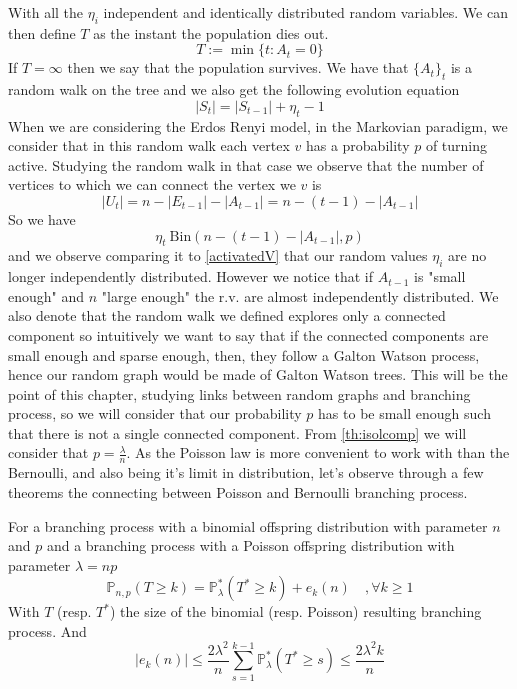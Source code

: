 With all the $\eta_i$ independent and identically distributed random variables.
We can then define $T$ as the instant the population dies out.
\begin{equation}
	T := \min\{t: A_t = 0\}
\end{equation}
If $T = \infty$ then we say that the population survives. 
\newline
We have that $\{A_t\}_t$ is a random walk on the tree and we also get the following evolution equation 
\begin{equation}\label{eq:St}
	|S_t| = |S_{t-1}| + \eta_t - 1
\end{equation}
\newline
When we are considering the Erdos Renyi model, in the Markovian paradigm, we consider that in this random walk each vertex $v$ has a probability $p$ of turning active. 
Studying the random walk in that case we observe that the number of vertices to which we can connect the vertex we $v$ is
\begin{equation}
	|U_t| = n - |E_{t-1}| - |A_{t-1}| = n - (t-1) - |A_{t-1}|
\end{equation}
So we have
\begin{equation}
	\eta_t ~ \text{Bin}( n - (t-1) - |A_{t-1}|, p)
\end{equation}
and we observe comparing it to \ref{activatedV} that our random values $\eta_i$ are no longer independently distributed. 
However we notice that if $A_{t-1}$ is "small enough" and $n$ "large enough" the r.v. are almost independently distributed.
We also denote that the random walk we defined explores only a connected component so intuitively we want to say that if the connected components are small enough and sparse enough, then, they follow a Galton Watson process, hence our random graph would be made of Galton Watson trees.
This will be the point of this chapter, studying links between random graphs and branching process, so we will consider that our probability $p$ has to be small enough such that there is not a single connected component. From \ref{th:isolcomp} we will consider that $p=\frac{\lambda}{n}$.
\newline
As the Poisson law is more convenient to work with than the Bernoulli, and also being it's limit in distribution, let's observe through a few theorems the connecting between Poisson and Bernoulli branching process.
\begin{theorem}\label{th:poibin}
For a branching process with a binomial offspring distribution with parameter $n$ and $p$ and a branching process with a Poisson offspring distribution with parameter $\lambda = np$
	\begin{equation}
		\mathbb{P}_{n,p}(T \geq k) = \mathbb{P}_{\lambda}^*(T^* \geq k) + e_k(n)\quad, \forall k \geq 1
	\end{equation}
	With $T$ (resp. $T^*$) the size of the binomial (resp. Poisson) resulting branching process.
	And 
	\begin{equation}
		|e_k(n)| \leq \frac{2\lambda ^2}{n}\sum_{s=1}^{k-1} \mathbb{P}_{\lambda}^*(T^* \geq s) \leq \frac{2\lambda ^2k}{n}
	\end{equation}
\end{theorem}
